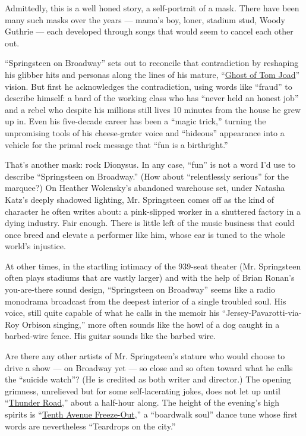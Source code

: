 Admittedly, this is a well honed story, a self-portrait of a mask. There
have been many such masks over the years --- mama's boy, loner, stadium
stud, Woody Guthrie --- each developed through songs that would seem to
cancel each other out.

``Springsteen on Broadway'' sets out to reconcile that contradiction by
reshaping his glibber hits and personas along the lines of his mature,
``\href{https://www.youtube.com/watch?v=NKKpmbcSe5E}{Ghost of Tom
Joad}'' vision. But first he acknowledges the contradiction, using words
like ``fraud'' to describe himself: a bard of the working class who has
``never held an honest job'' and a rebel who despite his millions still
lives 10 minutes from the house he grew up in. Even his five-decade
career has been a ``magic trick,'' turning the unpromising tools of his
cheese-grater voice and ``hideous'' appearance into a vehicle for the
primal rock message that ``fun is a birthright.''

That's another mask: rock Dionysus. In any case, ``fun'' is not a word
I'd use to describe ``Springsteen on Broadway.'' (How about
``relentlessly serious'' for the marquee?) On Heather Wolensky's
abandoned warehouse set, under Natasha Katz's deeply shadowed lighting,
Mr. Springsteen comes off as the kind of character he often writes
about: a pink-slipped worker in a shuttered factory in a dying industry.
Fair enough. There is little left of the music business that could once
breed and elevate a performer like him, whose ear is tuned to the whole
world's injustice.

At other times, in the startling intimacy of the 939-seat theater (Mr.
Springsteen often plays stadiums that are vastly larger) and with the
help of Brian Ronan's you-are-there sound design, ``Springsteen on
Broadway'' seems like a radio monodrama broadcast from the deepest
interior of a single troubled soul. His voice, still quite capable of
what he calls in the memoir his ``Jersey-Pavarotti-via-Roy Orbison
singing,'' more often sounds like the howl of a dog caught in a
barbed-wire fence. His guitar sounds like the barbed wire.

Are there any other artists of Mr. Springsteen's stature who would
choose to drive a show --- on Broadway yet --- so close and so often
toward what he calls the ``suicide watch''? (He is credited as both
writer and director.) The opening grimness, unrelieved but for some
self-lacerating jokes, does not let up until
``\href{https://www.youtube.com/watch?v=x5kXnq5IjdU}{Thunder Road},''
about a half-hour along. The height of the evening's high spirits is
``\href{https://www.youtube.com/watch?v=k8OC43MqZXk}{Tenth Avenue
Freeze-Out},'' a ``boardwalk soul'' dance tune whose first words are
nevertheless ``Teardrops on the city.''

